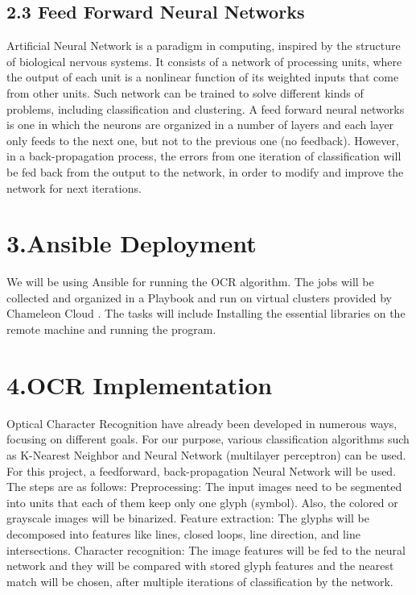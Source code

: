 \documentclass[9pt,twocolumn,twoside]{styles/osajnl}
\begin{document}
\subsection{2.3 Feed Forward Neural Networks}
Artificial Neural Network is a paradigm in computing, inspired by the
structure of biological nervous systems. It consists of a network of
processing units, where the output of each unit is a nonlinear
function of its weighted inputs that come from other units. Such
network can be trained to solve different kinds of problems, including
classification and clustering. A feed forward neural networks is one
in which the neurons are organized in a number of layers and each
layer only feeds to the next one, but not to the previous one (no
feedback). However, in a back-propagation process, the errors from one
iteration of classification will be fed back from the output to the
network, in order to modify and improve the network for next
iterations.

\section{3.Ansible Deployment}
We will be using Ansible \cite{www-ansible} for running the OCR algorithm. The jobs
will be collected and organized in a Playbook \cite{www-ansible-playbook} and run on virtual
clusters provided by Chameleon Cloud \cite{www-chameleoncloud}.  The tasks will include
Installing the essential libraries on the remote machine and running
the program.

\section{4.OCR Implementation}

Optical Character Recognition have already been developed in numerous
ways, focusing on different goals. For our purpose, various
classification algorithms such as K-Nearest Neighbor and Neural
Network (multilayer perceptron) can be used. For this project, a
feedforward, back-propagation Neural Network will be used. The steps
are as follows: Preprocessing: The input images need to be segmented
into units that each of them keep only one glyph (symbol). Also, the
colored or grayscale images will be binarized.  Feature extraction:
The glyphs will be decomposed into features like lines, closed loops,
line direction, and line intersections.  Character recognition: The
image features will be fed to the neural network and they will be
compared with stored glyph features and the nearest match will be
chosen, after multiple iterations of classification by the network.
\end{document}
